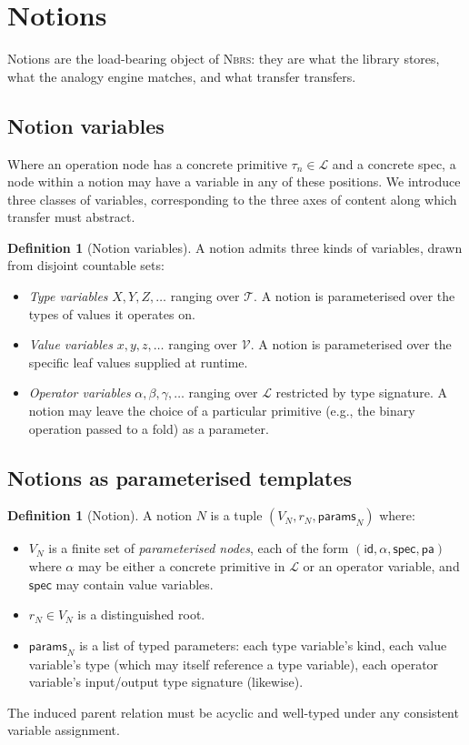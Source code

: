 \documentclass[11pt,a4paper]{article}
\theoremstyle{plain}
\theoremstyle{definition}
\newtheorem{definition}[theorem]{Definition}
\theoremstyle{remark}
\newcommand{\Lib}{\mathcal{L}}
\newcommand{\Types}{\mathcal{T}}
\newcommand{\Val}{\mathcal{V}}
\newcommand{\Spec}{\mathsf{spec}}
\newcommand{\Parents}{\mathsf{pa}}
\newcommand{\NBRS}{\textsc{Nbrs}}
\begin{document}
\section{Notions}
\label{sec:notions}

Notions are the load-bearing object of \NBRS: they are what the library stores, what the analogy engine matches, and what transfer transfers.

\subsection{Notion variables}

Where an operation node has a concrete primitive $\tau_n \in \Lib$ and a concrete spec, a node within a notion may have a variable in any of these positions. We introduce three classes of variables, corresponding to the three axes of content along which transfer must abstract.

\begin{definition}[Notion variables]
\label{def:notion-vars}
A notion admits three kinds of variables, drawn from disjoint countable sets:
\begin{itemize}[topsep=2pt,itemsep=2pt]
  \item \emph{Type variables} $X, Y, Z, \dots$ ranging over $\Types$. A notion is parameterised over the types of values it operates on.
  \item \emph{Value variables} $x, y, z, \dots$ ranging over $\Val$. A notion is parameterised over the specific leaf values supplied at runtime.
  \item \emph{Operator variables} $\alpha, \beta, \gamma, \dots$ ranging over $\Lib$ restricted by type signature. A notion may leave the choice of a particular primitive (e.g., the binary operation passed to a fold) as a parameter.
\end{itemize}
\end{definition}

\subsection{Notions as parameterised templates}

\begin{definition}[Notion]
\label{def:notion}
A notion $N$ is a tuple $(V_N, r_N, \mathsf{params}_N)$ where:
\begin{itemize}[topsep=2pt,itemsep=2pt]
  \item $V_N$ is a finite set of \emph{parameterised nodes}, each of the form $(\mathsf{id}, \alpha, \Spec, \Parents)$ where $\alpha$ may be either a concrete primitive in $\Lib$ or an operator variable, and $\Spec$ may contain value variables.
  \item $r_N \in V_N$ is a distinguished root.
  \item $\mathsf{params}_N$ is a list of typed parameters: each type variable's kind, each value variable's type (which may itself reference a type variable), each operator variable's input/output type signature (likewise).
\end{itemize}
The induced parent relation must be acyclic and well-typed under any consistent variable assignment.
\end{definition}
\end{document}
